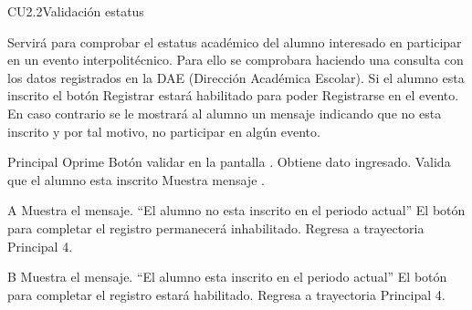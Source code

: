 \begin{UseCase}{CU2.2}{Validación estatus}{
		Servirá para comprobar el estatus académico del alumno interesado en participar en un evento interpolitécnico. Para ello se comprobara haciendo una consulta con los datos registrados en la DAE (Dirección Académica Escolar). Si el alumno esta inscrito el botón Registrar estará habilitado para poder Registrarse en el evento. En caso contrario se le mostrará al alumno un mensaje indicando que no esta inscrito y por tal motivo, no participar en algún evento. 

	}
		\end{UseCase}
    \begin{UCtrayectoria}{Principal}
    \UCpaso[\UCactor] Oprime Botón validar en la pantalla .
    \UCpaso Obtiene dato ingresado.
	\UCpaso Valida que el alumno esta inscrito 
    \UCpaso Muestra mensaje .  
    \end{UCtrayectoria}
    
	\begin{UCtrayectoriaA}{A}{}
		\UCpaso Muestra el mensaje. “El alumno no esta inscrito en el periodo actual”
		\UCpaso El botón para completar el registro permanecerá inhabilitado.
		\UCpaso Regresa a trayectoria Principal 4.
	\end{UCtrayectoriaA}
	
	\begin{UCtrayectoriaA}{B}{}
		\UCpaso Muestra el mensaje. “El alumno esta inscrito en el periodo actual”
		\UCpaso El botón para completar el registro estará habilitado.
        \UCpaso Regresa a trayectoria Principal 4.
	\end{UCtrayectoriaA}
